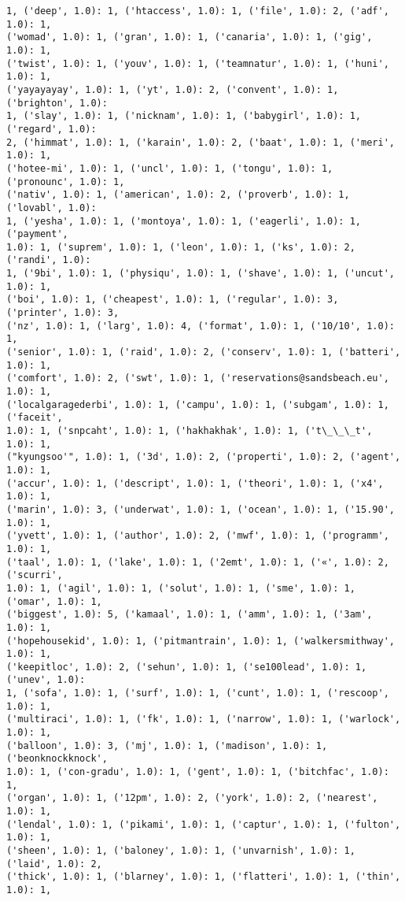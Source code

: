 \documentclass[11pt]{article}
\begin{document}
\begin{Verbatim}[commandchars=\\\{\}]
1, ('deep', 1.0): 1, ('htaccess', 1.0): 1, ('file', 1.0): 2, ('adf', 1.0): 1,
('womad', 1.0): 1, ('gran', 1.0): 1, ('canaria', 1.0): 1, ('gig', 1.0): 1,
('twist', 1.0): 1, ('youv', 1.0): 1, ('teamnatur', 1.0): 1, ('huni', 1.0): 1,
('yayayayay', 1.0): 1, ('yt', 1.0): 2, ('convent', 1.0): 1, ('brighton', 1.0):
1, ('slay', 1.0): 1, ('nicknam', 1.0): 1, ('babygirl', 1.0): 1, ('regard', 1.0):
2, ('himmat', 1.0): 1, ('karain', 1.0): 2, ('baat', 1.0): 1, ('meri', 1.0): 1,
('hotee-mi', 1.0): 1, ('uncl', 1.0): 1, ('tongu', 1.0): 1, ('pronounc', 1.0): 1,
('nativ', 1.0): 1, ('american', 1.0): 2, ('proverb', 1.0): 1, ('lovabl', 1.0):
1, ('yesha', 1.0): 1, ('montoya', 1.0): 1, ('eagerli', 1.0): 1, ('payment',
1.0): 1, ('suprem', 1.0): 1, ('leon', 1.0): 1, ('ks', 1.0): 2, ('randi', 1.0):
1, ('9bi', 1.0): 1, ('physiqu', 1.0): 1, ('shave', 1.0): 1, ('uncut', 1.0): 1,
('boi', 1.0): 1, ('cheapest', 1.0): 1, ('regular', 1.0): 3, ('printer', 1.0): 3,
('nz', 1.0): 1, ('larg', 1.0): 4, ('format', 1.0): 1, ('10/10', 1.0): 1,
('senior', 1.0): 1, ('raid', 1.0): 2, ('conserv', 1.0): 1, ('batteri', 1.0): 1,
('comfort', 1.0): 2, ('swt', 1.0): 1, ('reservations@sandsbeach.eu', 1.0): 1,
('localgaragederbi', 1.0): 1, ('campu', 1.0): 1, ('subgam', 1.0): 1, ('faceit',
1.0): 1, ('snpcaht', 1.0): 1, ('hakhakhak', 1.0): 1, ('t\_\_\_t', 1.0): 1,
("kyungsoo'", 1.0): 1, ('3d', 1.0): 2, ('properti', 1.0): 2, ('agent', 1.0): 1,
('accur', 1.0): 1, ('descript', 1.0): 1, ('theori', 1.0): 1, ('x4', 1.0): 1,
('marin', 1.0): 3, ('underwat', 1.0): 1, ('ocean', 1.0): 1, ('15.90', 1.0): 1,
('yvett', 1.0): 1, ('author', 1.0): 2, ('mwf', 1.0): 1, ('programm', 1.0): 1,
('taal', 1.0): 1, ('lake', 1.0): 1, ('2emt', 1.0): 1, ('«', 1.0): 2, ('scurri',
1.0): 1, ('agil', 1.0): 1, ('solut', 1.0): 1, ('sme', 1.0): 1, ('omar', 1.0): 1,
('biggest', 1.0): 5, ('kamaal', 1.0): 1, ('amm', 1.0): 1, ('3am', 1.0): 1,
('hopehousekid', 1.0): 1, ('pitmantrain', 1.0): 1, ('walkersmithway', 1.0): 1,
('keepitloc', 1.0): 2, ('sehun', 1.0): 1, ('se100lead', 1.0): 1, ('unev', 1.0):
1, ('sofa', 1.0): 1, ('surf', 1.0): 1, ('cunt', 1.0): 1, ('rescoop', 1.0): 1,
('multiraci', 1.0): 1, ('fk', 1.0): 1, ('narrow', 1.0): 1, ('warlock', 1.0): 1,
('balloon', 1.0): 3, ('mj', 1.0): 1, ('madison', 1.0): 1, ('beonknockknock',
1.0): 1, ('con-gradu', 1.0): 1, ('gent', 1.0): 1, ('bitchfac', 1.0): 1,
('organ', 1.0): 1, ('12pm', 1.0): 2, ('york', 1.0): 2, ('nearest', 1.0): 1,
('lendal', 1.0): 1, ('pikami', 1.0): 1, ('captur', 1.0): 1, ('fulton', 1.0): 1,
('sheen', 1.0): 1, ('baloney', 1.0): 1, ('unvarnish', 1.0): 1, ('laid', 1.0): 2,
('thick', 1.0): 1, ('blarney', 1.0): 1, ('flatteri', 1.0): 1, ('thin', 1.0): 1,

\end{Verbatim}
\end{document}
